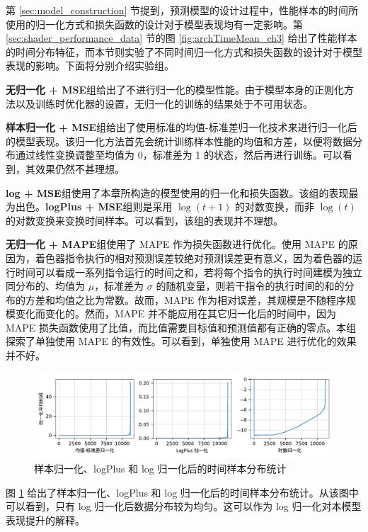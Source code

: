 {\added 第 \ref{sec:model_construction} 节提到，预测模型的设计过程中，性能样本的时间所使用的归一化方式和损失函数的设计对于模型表现均有一定影响。第 \ref{sec:shader_performance_data} 节的图 \ref{fig:archTimeMean_ch3} 给出了性能样本的时间分布特征，而本节则实验了不同时间归一化方式和损失函数的设计对于模型表现的影响。下面将分别介绍实验组。

{\bf 无归一化 + MSE}组给出了不进行归一化的模型性能。由于模型本身的正则化方法以及训练时优化器的设置，无归一化的训练的结果处于不可用状态。

{\bf 样本归一化 + MSE}组给出了使用标准的均值-标准差归一化技术来进行归一化后的模型表现。该归一化方法首先会统计训练样本性能的均值和方差，以便将数据分布通过线性变换调整至均值为 0，标准差为 1 的状态，然后再进行训练。可以看到，其效果仍然不甚理想。

{\bf log + MSE}组使用了本章所构造的模型使用的归一化和损失函数。该组的表现最为出色。{\bf logPlus + MSE}组则是采用 $ \log(t+1) $ 的对数变换，而非 $ \log(t) $ 的对数变换来变换时间样本。可以看到，该组的表现并不理想。

{\bf 无归一化 + MAPE}组使用了 MAPE 作为损失函数进行优化。使用 MAPE 的原因为，着色器指令执行的相对预测误差较绝对预测误差更有意义，因为着色器的运行时间可以看成一系列指令运行的时间之和，若将每个指令的执行时间建模为独立同分布的、均值为 $ \mu $，标准差为 $ \sigma $ 的随机变量，则若干指令的执行时间的和的分布的方差和均值之比为常数。故而，MAPE 作为相对误差，其规模是不随程序规模变化而变化的。然而，MAPE 并不能应用在其它归一化后的时间中，因为 MAPE 损失函数使用了比值，而比值需要目标值和预测值都有正确的零点。本组探索了单独使用 MAPE 的有效性。可以看到，单独使用 MAPE 进行优化的效果并不好。

\begin{figure}[htbp]
    \centering
    \includegraphics[width=1.0\linewidth]{figures/RTX3060-Mean-Time-Normalized.pdf}
    \caption{样本归一化、logPlus 和 log 归一化后的时间样本分布统计}
    \label{fig:normalize_methods}
\end{figure}

图 \ref{fig:normalize_methods} 给出了样本归一化、logPlus 和 log 归一化后的时间样本分布统计。从该图中可以看到，只有 log 归一化后数据分布较为均匀。这可以作为 log 归一化对本模型表现提升的解释。

}

